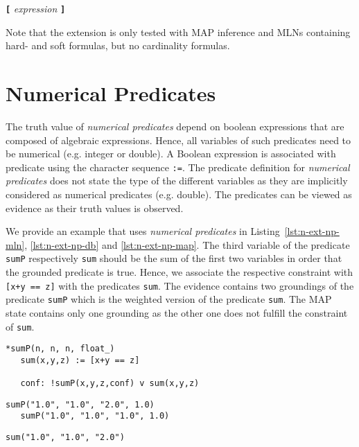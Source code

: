 \documentclass[11pt,titlepage,oneside,openany]{book}
\begin{document}
\begin{center}
\texttt{\textbf{[}} \textit{expression} \texttt{\textbf{]}}
\end{center}

Note that the extension is only tested with MAP inference and MLNs containing hard- and soft formulas, but no cardinality formulas.

\section{Numerical Predicates}
The truth value of \textit{numerical predicates} depend on boolean expressions that are composed of algebraic expressions. Hence, all variables of such predicates need to be numerical (e.g. integer or double). A Boolean expression is associated with predicate using the character sequence \texttt{:=}. The predicate definition for \textit{numerical predicates} does not state the type of the different variables as they are implicitly considered as numerical predicates (e.g. double). The predicates can be viewed as evidence as their truth values is observed.

We provide an example that uses \textit{numerical predicates} in Listing~\ref{lst:n-ext-np-mln}, \ref{lst:n-ext-np-db} and \ref{lst:n-ext-np-map}. The third variable of the predicate \texttt{sumP} respectively \texttt{sum} should be the sum of the first two variables in order that the grounded predicate is true. Hence, we associate the respective constraint with \texttt{[x+y == z]} with the predicates \texttt{sum}. The evidence contains two groundings of the predicate \texttt{sumP} which is the weighted version of the predicate \texttt{sum}. The MAP state contains only one grounding as the other one does not fulfill the constraint of \texttt{sum}.

\begin{lstlisting}[caption=Example for numerical predicates: prog.mln,label=lst:n-ext-np-mln]
   *sumP(n, n, n, float_)
   sum(x,y,z) := [x+y == z]

   conf: !sumP(x,y,z,conf) v sum(x,y,z)
\end{lstlisting} 

\begin{lstlisting}[caption=Example for numerical predicates: evidence.db,label=lst:n-ext-np-db]
   sumP("1.0", "1.0", "2.0", 1.0)
   sumP("1.0", "1.0", "1.0", 1.0)
\end{lstlisting}

\begin{lstlisting}[caption=Example for numerical predicates: out.db (MAP state),label=lst:n-ext-np-map]
   sum("1.0", "1.0", "2.0")
\end{lstlisting}
\end{document}

